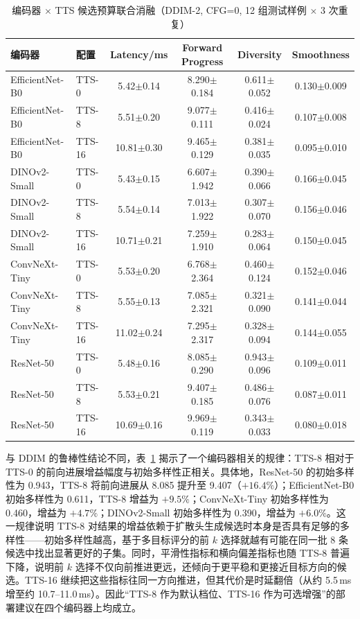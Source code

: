 \begin{table}[htbp]
    \centering
    \small
    \caption{编码器 $\times$ TTS 候选预算联合消融（DDIM-2, CFG=0, 12 组测试样例 $\times$ 3 次重复）}
    \label{tab:encoder-tts-joint}
    \begin{tabular}{llcccc}
        \toprule
        编码器 & 配置 & Latency/ms & Forward Progress & Diversity & Smoothness \\
        \midrule
        EfficientNet-B0 & TTS-0 & 5.42$\pm$0.14 & 8.290$\pm$0.184 & 0.611$\pm$0.052 & 0.130$\pm$0.009 \\
        EfficientNet-B0 & TTS-8 & 5.51$\pm$0.20 & 9.077$\pm$0.111 & 0.416$\pm$0.024 & 0.107$\pm$0.008 \\
        EfficientNet-B0 & TTS-16 & 10.81$\pm$0.30 & 9.465$\pm$0.129 & 0.381$\pm$0.035 & 0.095$\pm$0.010 \\
        DINOv2-Small & TTS-0 & 5.43$\pm$0.15 & 6.607$\pm$1.942 & 0.390$\pm$0.066 & 0.166$\pm$0.045 \\
        DINOv2-Small & TTS-8 & 5.54$\pm$0.14 & 7.013$\pm$1.922 & 0.307$\pm$0.070 & 0.156$\pm$0.046 \\
        DINOv2-Small & TTS-16 & 10.71$\pm$0.21 & 7.259$\pm$1.910 & 0.283$\pm$0.064 & 0.150$\pm$0.045 \\
        ConvNeXt-Tiny & TTS-0 & 5.53$\pm$0.20 & 6.768$\pm$2.364 & 0.460$\pm$0.124 & 0.152$\pm$0.046 \\
        ConvNeXt-Tiny & TTS-8 & 5.55$\pm$0.13 & 7.085$\pm$2.321 & 0.321$\pm$0.090 & 0.141$\pm$0.044 \\
        ConvNeXt-Tiny & TTS-16 & 11.02$\pm$0.24 & 7.295$\pm$2.317 & 0.328$\pm$0.094 & 0.144$\pm$0.055 \\
        ResNet-50 & TTS-0 & 5.48$\pm$0.16 & 8.085$\pm$0.290 & 0.943$\pm$0.096 & 0.109$\pm$0.011 \\
        ResNet-50 & TTS-8 & 5.53$\pm$0.21 & 9.407$\pm$0.185 & 0.486$\pm$0.076 & 0.087$\pm$0.011 \\
        ResNet-50 & TTS-16 & 10.69$\pm$0.16 & 9.969$\pm$0.119 & 0.343$\pm$0.033 & 0.080$\pm$0.018 \\
        \bottomrule
    \end{tabular}
\end{table}

与 DDIM 的鲁棒性结论不同，表~\ref{tab:encoder-tts-joint} 揭示了一个编码器相关的规律：TTS-8 相对于 TTS-0 的前向进展增益幅度与初始多样性正相关。具体地，ResNet-50 的初始多样性为 0.943，TTS-8 将前向进展从 8.085 提升至 9.407（$+16.4\%$）；EfficientNet-B0 初始多样性为 0.611，TTS-8 增益为 $+9.5\%$；ConvNeXt-Tiny 初始多样性为 0.460，增益为 $+4.7\%$；DINOv2-Small 初始多样性为 0.390，增益为 $+6.0\%$。这一规律说明 TTS-8 对结果的增益依赖于扩散头生成候选时本身是否具有足够的多样性——初始多样性越高，基于多目标评分的前 $k$ 选择就越有可能在同一批 8 条候选中找出显著更好的子集。同时，平滑性指标和横向偏差指标也随 TTS-8 普遍下降，说明前 $k$ 选择不仅向前推进更远，还倾向于更平稳和更接近目标方向的候选。TTS-16 继续把这些指标往同一方向推进，但其代价是时延翻倍（从约 5.5\,ms 增至约 10.7--11.0\,ms）。因此``TTS-8 作为默认档位、TTS-16 作为可选增强''的部署建议在四个编码器上均成立。

